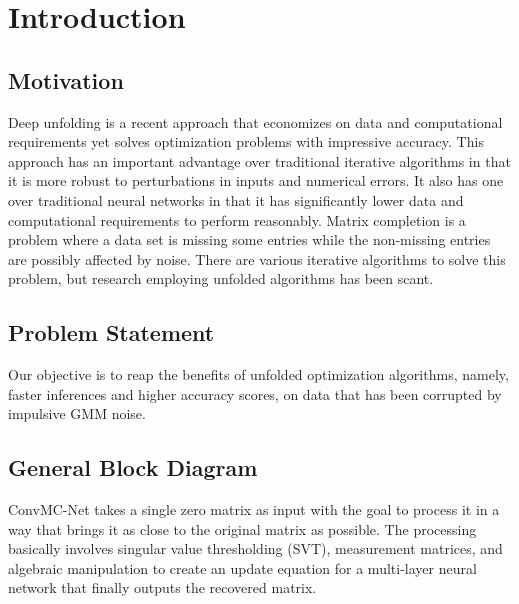 \chapter{Introduction} %
\label{Chapter1}
\lhead{} %

\section{Motivation}
Deep unfolding is a recent approach that economizes on data and computational requirements yet solves optimization problems with impressive accuracy. This approach has an important advantage over traditional iterative algorithms in that it is more robust to perturbations in inputs and numerical errors. It also has one over traditional neural networks in that it has significantly lower data and computational requirements to perform reasonably. Matrix completion is a problem where a data set is missing some entries while the non-missing entries are possibly affected by noise. There are various iterative algorithms to solve this problem, but research employing unfolded algorithms has been scant.

\section{Problem Statement}
Our objective is to reap the benefits of unfolded optimization algorithms, namely, faster inferences and higher accuracy scores, on data that has been corrupted by impulsive GMM noise.

\section{General Block Diagram}
ConvMC-Net takes a single zero matrix as input with the goal to process it in a way that brings it as close to the original matrix as possible. The processing basically involves singular value thresholding (SVT), measurement matrices, and algebraic manipulation to create an update equation for a multi-layer neural network that finally outputs the recovered matrix.

